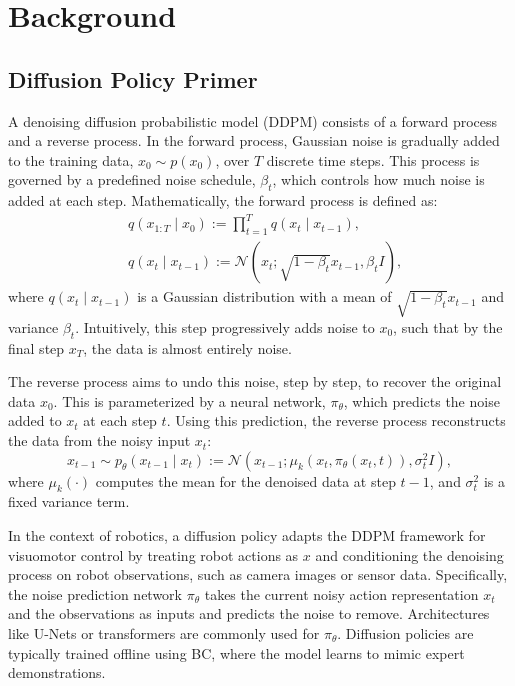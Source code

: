 \section{Background}

\subsection{Diffusion Policy Primer}

A denoising diffusion probabilistic model (DDPM) \cite{ho2020denoising, song2020denoising} consists of a forward process and a reverse process. In the forward process, Gaussian noise is gradually added to the training data, $x_0 \sim p(x_0)$, over $T$ discrete time steps. This process is governed by a predefined noise schedule, $\beta_t$, which controls how much noise is added at each step. Mathematically, the forward process is defined as:
\begin{align*}
&q(x_{1:T} \mid x_0) := \prod_{t=1}^T q(x_t \mid x_{t-1}), \\
&q(x_t \mid x_{t-1}) := \mathcal{N}(x_t; \sqrt{1 - \beta_t} x_{t-1}, \beta_t I),
\end{align*}
where $q(x_t \mid x_{t-1})$ is a Gaussian distribution with a mean of $\sqrt{1 - \beta_t} x_{t-1}$ and variance $\beta_t$. Intuitively, this step progressively adds noise to $x_0$, such that by the final step $x_T$, the data is almost entirely noise.

The reverse process aims to undo this noise, step by step, to recover the original data $x_0$. This is parameterized by a neural network, $\pi_\theta$, which predicts the noise added to $x_t$ at each step $t$. Using this prediction, the reverse process reconstructs the data from the noisy input $x_t$:
\begin{equation*}
x_{t-1} \sim p_\theta(x_{t-1} \mid x_t) := \mathcal{N}(x_{t-1}; \mu_k(x_t, \pi_{\theta}(x_t, t)), \sigma_t^2 I),
\end{equation*}
where $\mu_k(\cdot)$ computes the mean for the denoised data at step $t-1$, and $\sigma_t^2$ is a fixed variance term.

In the context of robotics, a diffusion policy \cite{chi_dp} adapts the DDPM framework for visuomotor control by treating robot actions as $x$ and conditioning the denoising process on robot observations, such as camera images or sensor data. Specifically, the noise prediction network $\pi_\theta$ takes the current noisy action representation $x_t$ and the observations as inputs and predicts the noise to remove. Architectures like U-Nets \cite{ronneberger2015u} or transformers \cite{vaswani2017attention} are commonly used for $\pi_\theta$. Diffusion policies are typically trained offline using BC, where the model learns to mimic expert demonstrations.

